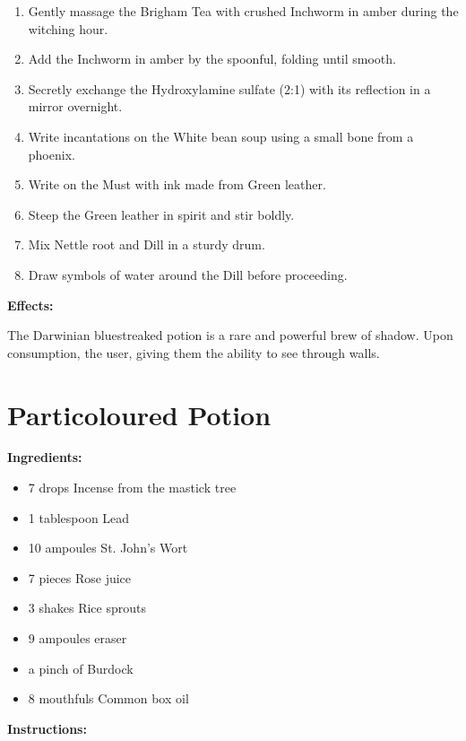 \documentclass{article}
\begin{document}
\begin{enumerate}
  \item Gently massage the Brigham Tea with crushed Inchworm in amber during the witching hour.
  \item Add the Inchworm in amber by the spoonful, folding until smooth.
  \item Secretly exchange the Hydroxylamine sulfate (2:1) with its reflection in a mirror overnight.
  \item Write incantations on the White bean soup using a small bone from a phoenix.
  \item Write on the Must with ink made from Green leather.
  \item Steep the Green leather in spirit and stir boldly.
  \item Mix Nettle root and Dill in a sturdy drum.
  \item Draw symbols of water around the Dill before proceeding.
\end{enumerate}

\textbf{Effects:}

The Darwinian bluestreaked potion is a rare and powerful brew of shadow. Upon consumption, the user, giving them the ability to see through walls.

\newpage
\section*{Particoloured Potion}

\textbf{Ingredients:}

\begin{itemize}
  \item 7 drops Incense from the mastick tree
  \item 1 tablespoon Lead
  \item 10 ampoules St. John's Wort
  \item 7 pieces Rose juice
  \item 3 shakes Rice sprouts
  \item 9 ampoules eraser
  \item a pinch of Burdock
  \item 8 mouthfuls Common box oil
\end{itemize}

\textbf{Instructions:}
\end{document}
